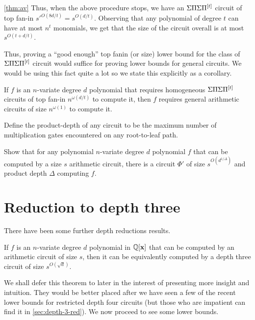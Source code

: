 \begin{proofof}{\autoref{thm:av}}
Thus, when the above procedure stops, we have an $\Sigma\Pi\Sigma\Pi^{[t]}$ circuit of top fan-in $s'^{O(8d/t)} = s^{O(d/t)}$. 
Observing that any polynomial of degree $t$ can have at most $n^t$ monomials, we get that the size of the circuit overall is at most $s^{O(t + d/t)}$. 
\end{proofof}

Thus, proving a ``good enough'' top fanin (or size) lower bound for the class of $\Sigma\Pi\Sigma\Pi^{[t]}$ circuit would suffice for proving lower bounds for general circuits. 
We would be using this fact quite a lot so we state this explicitly as a corollary. 

\begin{corollary}\label{cor:av}
If $f$ is an $n$-variate degree $d$ polynomial that requires homogeneous $\Sigma\Pi\Sigma\Pi^{[t]}$ circuits of top fan-in $n^{\omega(d/t)}$ to compute it, then $f$ requires general arithmetic circuits of size $n^{\omega(1)}$ to compute it. 
\end{corollary}

\begin{exercise}\label{exercise:depth-reduction-prod-depth}
Define the product-depth of any circuit to be the maximum number of multiplication gates encountered on any root-to-leaf path. 

Show that for any polynomial $n$-variate degree $d$ polynomial $f$ that can be computed by a size $s$ arithmetic circuit, there is a circuit $\Phi'$ of size $s^{O(d^{1/\Delta})}$ and product depth $\Delta$ computing $f$. 
\end{exercise}

\section*{Reduction to depth three}

There have been some further depth reductions results. 

\begin{theorem} If $f$ is an $n$-variate degree $d$ polynomial in $\mathbb{Q}[\mathbf{x}]$ that can be computed by an arithmetic circuit of size $s$, then it can be equivalently computed by a depth three circuit of size $s^{O(\sqrt{d})}$. 
\end{theorem}

We shall defer this theorem to later in the interest of presenting more insight and intuition. 
They would be better placed after we have seen a few of the recent lower bounds for restricted depth four circuits (but those who are impatient can find it in \autoref{sec:depth-3-red}). 
We now proceed to see some lower bounds. 


